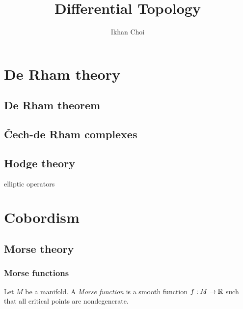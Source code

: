 \documentclass{../../large}
\begin{document}
\title{Differential Topology}
\author{Ikhan Choi}
\maketitle
\tableofcontents



\part{De Rham theory}
\chapter{De Rham theorem}
\chapter{\v Cech-de Rham complexes}
\chapter{Hodge theory}
elliptic operators


\part{Cobordism}
\chapter{Morse theory}
\section{Morse functions}

\begin{defn}
Let $M$ be a manifold.
A \emph{Morse function} is a smooth function $f:M\to\mathbb{R}$ such that all critical points are nondegenerate.
\end{defn}
\end{document}

